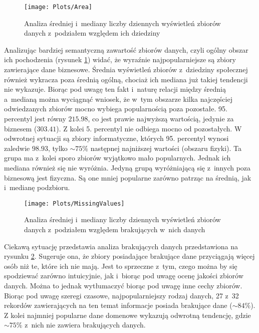 \begin{figure}[ht]
  \texttt{[image: Plots/Area]}
  \caption{Analiza średniej i~mediany liczby dziennych wyświetleń zbiorów danych z~podziałem względem ich dziedziny}
  \label{fig:area}
\end{figure}

Analizując bardziej semantyczną zawartość zbiorów danych, czyli ogólny obszar ich pochodzenia (rysunek \ref{fig:area}) widać, że wyraźnie najpopularniejsze są zbiory zawierające dane biznesowe.
Średnia wyświetleń zbiorów z~dziedziny społecznej również wykracza poza średnią ogólną, chociaż ich mediana już takiej tendencji nie wykazuje.
Biorąc pod uwagę ten fakt i~naturę relacji między średnią a~medianą można wyciągnąć wniosek, że w~tym obszarze kilka najczęściej odwiedzanych zbiorów mocno wybiega popularnością poza pozostałe.
95. percentyl jest równy \(215.98\), co jest prawie najwyższą wartością, jedynie za biznesem (\(303.41\)).
Z kolei 5. percentyl nie odbiega mocno od pozostałych.
W odwrotnej sytuacji są zbiory informatyczne, których 95. percentyl wynosi zaledwie \(98.93\), tylko \(\sim 75\%\) następnej najniższej wartości (obszaru fizyki).
Ta grupa ma z~kolei sporo zbiorów wyjątkowo mało popularnych.
Jednak ich mediana również się nie wyróżnia.
Jedyną grupą wyróżniającą się z~innych poza biznesową jest fizyczna.
Są one mniej popularne zarówno patrząc na średnią, jak i~medianę podzbioru.

\begin{figure}[ht]
      \texttt{[image: Plots/MissingValues]}
      \caption{Analiza średniej i~mediany liczby dziennych wyświetleń zbiorów danych z~podziałem względem brakujących w~nich danych}
      \label{fig:missingvalues}
\end{figure}

Ciekawą sytuację przedstawia analiza brakujących danych przedstawiona na rysunku \ref{fig:missingvalues}.
Sugeruje ona, że zbiory posiadające brakujące dane przyciągają więcej osób niż te, które ich nie mają.
Jest to sprzeczne z~tym, czego można by się spodziewać zarówno intuicyjnie, jak i~biorąc pod uwagę ocenę jakości zbiorów danych.
Można to jednak wytłumaczyć biorąc pod uwagę inne cechy zbiorów.
Biorąc pod uwagę szeregi czasowe, najpopularniejszy rodzaj danych, 27 z~32 rekordów zawierających na ten temat informacje posiada brakujące dane (\(\sim 84\%\)).
Z kolei najmniej popularne dane domenowe wykazują odwrotną tendencję, gdzie \(\sim 75\%\) z~nich nie zawiera brakujących danych.

